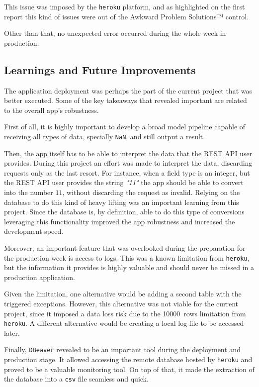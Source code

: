 \documentclass[a4paper,11pt]{article}
\begin{document}
This issue was imposed by the \texttt{heroku} platform, and as highlighted on the first report this kind of issues were out of the Awkward Problem Solutions™ control. 

Other than that, no unexpected error occurred during the whole week in production.

\subsection{Learnings and Future Improvements}

The application deployment was perhaps the part of the current project that was better executed. Some of the key takeaways that revealed important are related to the overall app's robustness.

First of all, it is highly important to develop a broad model pipeline capable of receiving all types of data, specially \texttt{NaN}, and still output a result.

Then, the app itself has to be able to interpret the data that the REST API user provides. During this project an effort was made to interpret the data, discarding requests only as the last resort.
For instance, when a field type is an integer, but the REST API user provides the string \textit{"11"} the app should be able to convert into the number $11$, without discarding the request as invalid.
Relying on the database to do this kind of heavy lifting was an important learning from this project. Since the database is, by definition, able to do this type of conversions leveraging this functionality improved the app robustness and increased the development speed.

Moreover, an important feature that was overlooked during the preparation for the production week is access to logs. This was a known limitation from \texttt{heroku}, but the information it provides is highly valuable and should never be missed in a production application. 

Given the limitation, one alternative would be adding a second table with the triggered exceptions. However, this alternative was not viable for the current project, since it imposed a data loss risk due to the \SI{10000}{rows} limitation from \texttt{heroku}. A different alternative would be creating a local log file to be accessed later.

Finally, \texttt{DBeaver} revealed to be an important tool during the deployment and production stage. It allowed accessing the remote database hosted by \texttt{heroku} and proved to be a valuable monitoring tool. On top of that, it made the extraction of the database into a \texttt{csv} file seamless and quick.

\end{document}
